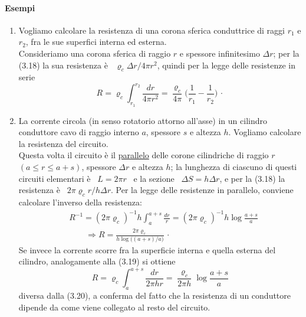 \paragraph{Esempi}
\begin{enumerate}
  \item Vogliamo calcolare la resistenza di una corona sferica conduttrice di
    raggi $r_1$ e $r_2$, fra le sue superfici interna ed esterna.\\
    Consideriamo una corona sferica di raggio $r$ e spessore infinitesimo
    $\Delta r$; per la (3.18) la sua resistenza \`e
    \ $\varrho_c\Delta r/4\pi r^2$, quindi per la legge delle resistenze in
    serie
    \begin{equation}
      R=\varrho_c\int_{r_1}^{r_2}\frac{dr}{4\pi r^2}
      =\frac{\varrho_c}{4\pi}\Big(\frac{1}{r_1}-\frac{1}{r_2}\Big)\,\cdot
      \tag{3.19}
    \end{equation}
  \item La corrente circola (in senso rotatorio attorno all'asse) in un cilindro
    conduttore cavo di raggio interno $a$, spessore $s$ e altezza $h$. Vogliamo
    calcolare la resistenza del circuito.\\
    Questa volta il circuito \`e il \underline{parallelo} delle corone
    cilindriche di raggio $r$ \ $(a\le r\le a+s)$, spessore $\Delta r$ e altezza
    $h$; la lunghezza di ciascuno di questi circuiti elementari \`e \ $L=2\pi r$
    \ e la sezione \ $\Delta S=h\Delta r$, e per la (3.18) la resistenza \`e
    \ $2\pi\varrho_cr/h\Delta r$. Per la legge delle resistenze in parallelo,
    conviene calcolare l'inverso della resistenza:
    \begin{equation}
      \begin{aligned}
        &R^{-1}=(2\pi\varrho_c)^{-1}h\int_a^{a+s}\frac{dr}{r}
        =(2\pi\varrho_c)^{-1}h\log\frac{a+s}{a}\\
        &\qquad\Rightarrow R=\frac{2\pi\varrho_c}{h\log\big((a+s)/a\big)}\,\cdot
      \end{aligned}
      \tag{3.20}
    \end{equation}
    Se invece la corrente scorre fra la superficie interna e quella esterna del
    cilindro, analogamente alla (3.19) si ottiene
    \begin{equation}
      R=\varrho_c\int_a^{a+s}\frac{dr}{2\pi hr}
      =\frac{\varrho_c}{2\pi h}\log\frac{a+s}{a}
      \tag{3.21}
    \end{equation}
    diversa dalla (3.20), a conferma del fatto che la resistenza di un
    conduttore dipende da come viene collegato al resto del circuito.
\end{enumerate}

